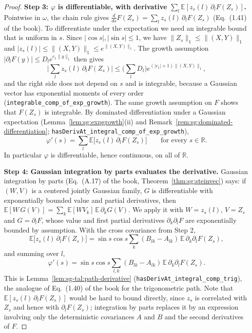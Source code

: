 \begin{proof}
\textbf{Step 3: $\varphi$ is differentiable, with derivative $\sum_l\mathbb{E}[z_s(l)\,\partial_lF(Z_s)]$.}
Pointwise in $\omega$, the chain rule gives $\frac{d}{ds}F(Z_s)=\sum_lz_s(l)\,\partial_lF(Z_s)$ (Eq.~(1.41) of the book). To differentiate under the expectation we need an integrable bound that is uniform in $s$.
Since $|\cos s|,|\sin s|\le1$, we have $\|Z_s\|_1\le\|(X,Y)\|_1$ and $|z_s(l)|\le\|(X,Y)\|_1\le e^{\|(X,Y)\|_1}$. The growth assumption $|\partial_lF(y)|\le D_le^{c_1\|y\|_1}$ then gives
\[
\Big|\sum_lz_s(l)\,\partial_lF(Z_s)\Big|\le\Big(\sum_lD_l\Big)e^{(|c_1|+1)\|(X,Y)\|_1},
\]
and the right side does not depend on $s$ and is integrable, because a Gaussian vector has exponential moments of every order (\texttt{integrable\_comp\_of\_exp\_growth}). The same growth assumption on $F$ shows that $F(Z_s)$ is integrable. By dominated differentiation under a Gaussian expectation (Lemma~\ref{lem:sg:expgrowth}(ii) and Remark~\ref{rem:sg:dominated-differentiation}; \texttt{hasDerivAt\_integral\_comp\_of\_exp\_growth}),
\[
\varphi'(s)=\sum_l\mathbb{E}\big[z_s(l)\,\partial_lF(Z_s)\big]\qquad\text{for every }s\in\mathbb R.
\]
In particular $\varphi$ is differentiable, hence continuous, on all of $\mathbb R$.

\textbf{Step 4: Gaussian integration by parts evaluates the derivative.}
Gaussian integration by parts (Eq.~(A.17) of the book, Theorem~\ref{thm:sg:steinvec}) says: if $(W,V)$ is a centered jointly Gaussian family, $G$ is differentiable with exponentially bounded value and partial derivatives, then
$\mathbb{E}[W\,G(V)]=\sum_k\mathbb{E}[WV_k]\,\mathbb{E}\,\partial_kG(V)$. We apply it with $W=z_s(l)$, $V=Z_s$ and $G=\partial_lF$, whose value and first partial derivatives $\partial_k\partial_lF$ are exponentially bounded by assumption. With the cross covariance from Step 2,
\[
\mathbb{E}\big[z_s(l)\,\partial_lF(Z_s)\big]=\sin s\cos s\sum_k(B_{lk}-A_{lk})\,\mathbb{E}\,\partial_k\partial_lF(Z_s),
\]
and summing over $l$,
\[
\varphi'(s)=\sin s\cos s\sum_{l,k}(B_{lk}-A_{lk})\,\mathbb{E}\,\partial_k\partial_lF(Z_s).
\]
This is Lemma~\ref{lem:sg-tal:path-derivative} (\texttt{hasDerivAt\_integral\_comp\_trig}), the analogue of Eq.~(1.40) of the book for the trigonometric path.
Note that $\mathbb{E}[z_s(l)\,\partial_lF(Z_s)]$ would be hard to bound directly, since $z_s$ is correlated with $Z_s$ and hence with $\partial_lF(Z_s)$; integration by parts replaces it by an expression involving only the deterministic covariances $A$ and $B$ and the second derivatives of $F$.


\end{proof}
